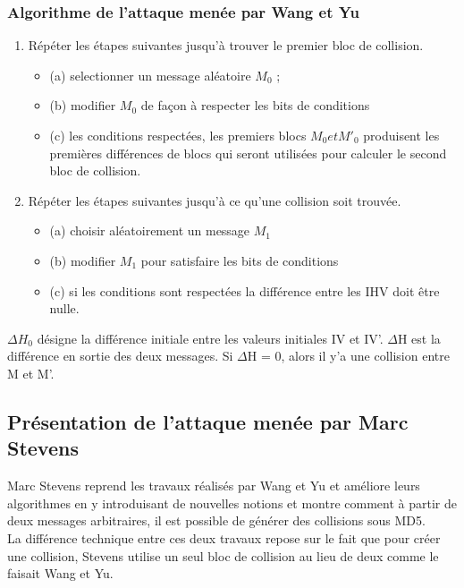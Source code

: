 \subsubsection{Algorithme de l'attaque menée par Wang et Yu}
\begin{enumerate}
\item Répéter les étapes suivantes jusqu'à trouver le premier bloc de collision.
  \begin{itemize}
  \item (a) selectionner un message aléatoire $M_0$ ;
  \item (b) modifier $M_0$ de fa\c con à respecter les bits de conditions
  \item (c) les conditions respectées, les premiers blocs $M_0 et M'_0$ produisent les premières différences de blocs qui seront utilisées pour calculer le second bloc de collision.
  \end{itemize}
\item Répéter les étapes suivantes jusqu'à ce qu'une collision soit trouvée.
 \begin{itemize}
 \item (a) choisir aléatoirement un message $M_1$
 \item (b) modifier $M_1$ pour satisfaire les bits de conditions
 \item (c) si les conditions sont respectées la différence entre les IHV doit être nulle.
 \end{itemize}
\end{enumerate}


$\Delta$$H_0$ désigne la différence initiale entre les valeurs initiales IV et IV'. $\Delta$H est la différence en sortie des deux messages. Si $\Delta$H = 0, alors il y'a une collision entre M et M'.

\subsection{Présentation de l'attaque menée par Marc Stevens}
Marc Stevens reprend les travaux réalisés par Wang et Yu et améliore leurs algorithmes en y introduisant de nouvelles notions et montre comment à partir de deux messages arbitraires, il est possible de générer des collisions sous MD5.\\

La différence technique entre ces deux travaux repose sur le fait que pour créer une collision, Stevens utilise un seul bloc de collision au lieu de deux comme le faisait Wang et Yu. 

